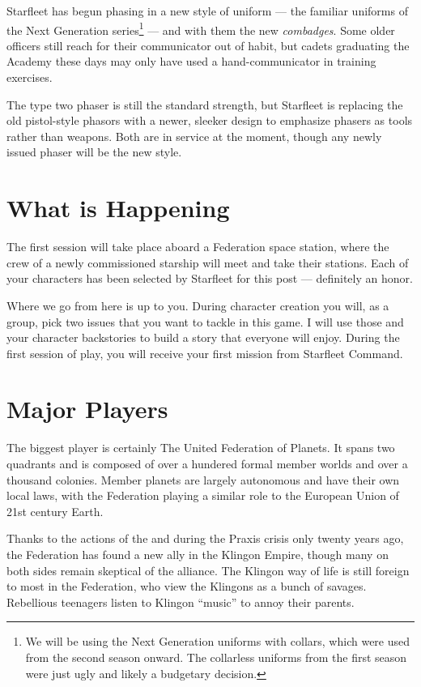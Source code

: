 \documentclass[12pt]{article}
\begin{document}
Starfleet has begun phasing in a new style of uniform --- the familiar uniforms
of the Next Generation series\footnote{We will be using the Next Generation
uniforms with collars, which were used from the second season onward. The
collarless uniforms from the first season were just ugly and likely a budgetary
decision.} --- and with them the new \emph{combadges}. Some older officers
still reach for their communicator out of habit, but cadets graduating the
Academy these days may only have used a hand-communicator in training
exercises.

The type two phaser is still the standard strength, but Starfleet is
replacing the old pistol-style phasors with a newer, sleeker design to
emphasize phasers as tools rather than weapons. Both are in service at the
moment, though any newly issued phaser will be the new style.

\section{What is Happening}
The first session will take place aboard a Federation space station, where the
crew of a newly commissioned  starship will meet and take
their stations. Each of your characters has been selected by Starfleet for this
post --- definitely an honor.

Where we go from here is up to you. During character creation you will, as a
group, pick two issues that you want to tackle in this game. I will use those
and your character backstories to build a story that everyone will enjoy.
During the first session of play, you will receive your first mission from
Starfleet Command.

\section{Major Players}
The biggest player is certainly The United Federation of Planets. It spans two
quadrants and is composed of over a hundered formal member worlds and over a
thousand colonies. Member planets are largely autonomous and have their own
local laws, with the Federation playing a similar role to the European Union of
21st century Earth.

Thanks to the actions of the  and 
during the Praxis crisis only twenty years ago, the Federation has found a new
ally in the Klingon Empire, though many on both sides remain skeptical of the
alliance. The Klingon way of life is still foreign to most in the Federation,
who view the Klingons as a bunch of savages. Rebellious teenagers listen to
Klingon ``music'' to annoy their parents.
\end{document}
